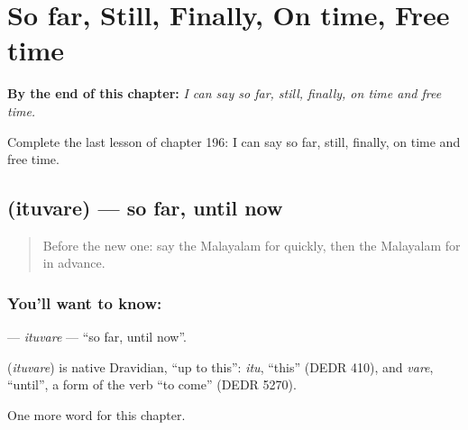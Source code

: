 
\chapter{So far, Still, Finally, On time, Free time}
\label{ch:ml-so-far-still-finally-on-time-free-time}

\begin{chapteropening}
\textbf{By the end of this chapter:} \emph{I can say so far, still, finally, on time and free time.}

Complete the last lesson of chapter 196: I can say so far, still, finally, on time and free time.
\end{chapteropening}

\section[\texorpdfstring{\ml{ഇതുവരെ} (ituvare)}{ഇതുവരെ (ituvare)}]{ (ituvare) — so far, until now}

\label{lesson:ML-C196-ituvare}



\begin{quote}
Before the new one: say the Malayalam for quickly, then the Malayalam for in advance.
\end{quote}

\subsection*{You'll want to know: }
\textbf{} — \emph{ituvare} — \textquotedblleft{}so far, until now\textquotedblright{}.

\begin{cousinweb}
\textbf{} (\emph{ituvare}) is native Dravidian, \textquotedblleft{}up to this\textquotedblright{}: \emph{itu}, \textquotedblleft{}this\textquotedblright{} (DEDR 410), and \emph{vare}, \textquotedblleft{}until\textquotedblright{}, a form of the verb \textquotedblleft{}to come\textquotedblright{} (DEDR 5270).
\end{cousinweb}

\begin{grammarlens}[title={What you've built}]
One more word for this chapter.
\end{grammarlens}

